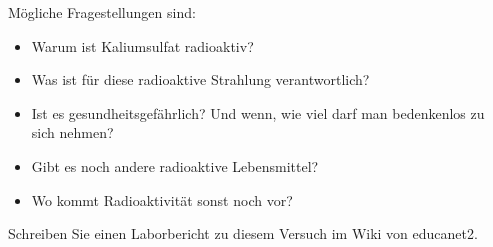 \documentclass[12pt,a4paper, twosite]{article}
\begin{document}
Mögliche Fragestellungen sind:
\begin{itemize}
	\item Warum ist Kaliumsulfat radioaktiv?
	\item Was ist für diese radioaktive Strahlung verantwortlich?
	\item Ist es gesundheitsgefährlich? Und wenn, wie viel darf man bedenkenlos zu sich nehmen? 
	\item Gibt es noch andere radioaktive Lebensmittel?
	\item Wo kommt Radioaktivität sonst noch vor?
\end{itemize}

Schreiben Sie einen Laborbericht zu diesem Versuch im Wiki von educanet2.
\end{document}
